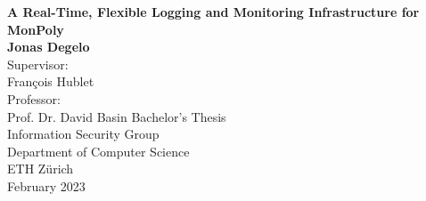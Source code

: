 \begin{titlepage}
    \begin{center}
        \vspace*{1cm}
        \Huge
        \textbf{A Real-Time, Flexible Logging and Monitoring Infrastructure for MonPoly} \\
        \vspace{0.5cm}
        \LARGE
        \vspace{1.5cm}
        \textbf{Jonas Degelo} \\
        \vspace{1.5cm}
        Supervisor: \\
        François Hublet \\

        Professor: \\
        Prof. Dr. David Basin
        \vfill
        Bachelor's Thesis \\
        \vspace{0.8cm}
        \Large
        Information Security Group\\
        Department of Computer Science\\
        ETH Zürich\\
        February 2023
    \end{center}
\end{titlepage}